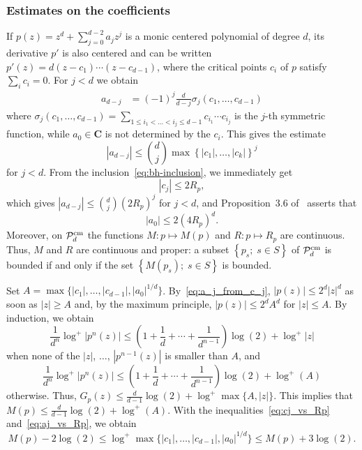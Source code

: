 \documentclass[oneside, 12pt]{amsart}
\newcommand{\set}[1]{\left\{#1\right\}}
\newcommand{\abs}[1]{\left\vert#1\right\vert}
\newcommand{\C}{\mathbf{C}}
\theoremstyle{plain}
\theoremstyle{definition}
\numberwithin{equation}{section}       %
\numberwithin{equation}{section}       %
\begin{document}
\subsubsection{Estimates on the coefficients} 
If
$
p(z)=z^d+\sum_{j=0}^{d-2} a_jz^j
$ is a monic centered polynomial of degree $d$, 
its derivative $p'$ is also centered and can be written 
$p'(z)=d(z-c_1)\cdots (z-c_{d-1})$,
where the critical points $c_i$ of $p$ satisfy $\sum_i c_i=0$. For $j< d$ we obtain
\begin{align}
a_{d-j} &= (-1)^j\frac{d}{d-j}\sigma_j(c_1, \ldots, c_{d-1})  
\end{align} 
where $\sigma_j(c_1, \ldots, c_{d-1})=\sum_{1\leq i_1 < \ldots < i_j \leq d-1} c_{i_1}\cdots c_{i_j}$ is the $j$-th symmetric function, while $a_0\in \C$ is not determined by the $c_i$. This gives the estimate 
\begin{equation}
\label{eq:a_j_from_c_j}
\abs{a_{d-j}}\leq {d \choose j} \max\set{\abs{c_1}, \ldots, \abs{c_k}}^j
\end{equation}
for $j< d$.
From the inclusion~\eqref{eq:bh-inclusion}, %
we immediately get 
\begin{equation}
\label{eq:cj_vs_Rp}\abs{c_j}\leq 2 R_p, 
\end{equation}
which  gives $\abs{a_{d-j}}\leq {d \choose j} (2R_p)^{j}$ for $j< d$, and 
Proposition~3.6 of~\cite{branner-hubbard1} asserts that 
\begin{equation}
\label{eq:aj_vs_Rp}\abs{a_0}\leq 2 (4R_p)^d.
\end{equation}
 Moreover, on $\mathcal P_d^{\rm cm}$ the functions $M\colon p\mapsto M(p)$ and $R\colon p\mapsto R_p$ are  continuous. Thus, $M$ and $R$ are continuous and proper: a subset $\set{ p_s; \; s\in S }$ of $\mathcal P_d^{\rm cm}$ is bounded if and only if the set $\set{ M(p_s); \; s\in S}$ is bounded. 

Set 
$A=\max\{\abs{c_1}, \ldots, \abs{c_{d-1}}, \abs{a_0}^{1/d}\}$. By~\eqref{eq:a_j_from_c_j}, 
$\abs{p(z)}\leq 2^d\abs{z}^d$ as soon as $\abs{z}\geq A$ and, by the maximum principle, $\abs{p(z)}\leq 2^d A^d$ for $\abs{z}\leq A$. By induction, we obtain
\begin{equation}
\frac{1}{d^n}\log^+\abs{p^n(z)} \leq (1+ \frac{1}{d}+ \cdots +\frac{1}{d^{n-1}})\log(2) + \log^+\abs{z}
\end{equation}
when none of the $\abs{z}$, $\ldots$, $\abs{p^{n-1}(z)}$ is smaller than $ A$, and 
\begin{equation}
\frac{1}{d^n}\log^+\abs{p^n(z)} \leq (1+ \frac{1}{d}+ \cdots +\frac{1}{d^{n-1}})\log(2) + \log^+(A)
\end{equation}
otherwise. Thus, $G_p(z)\leq \frac{d}{d-1}\log(2)+ \log^+\max\{A,\abs{z}\}$. This implies that 
$M(p)\leq \frac{d}{d-1}\log(2)+ \log^+(A)$.
With the inequalities~\eqref{eq:cj_vs_Rp} and~\eqref{eq:aj_vs_Rp}, we obtain
\begin{equation}
\label{eq:comparaison_Mp_cj}
M(p)-2\log(2) \leq  \log^+\max\{\abs{c_1}, \ldots, \abs{c_{d-1}}, \abs{a_0}^{1/d}\} \leq M(p)+ 3\log(2)  .
\end{equation}
\end{document}
